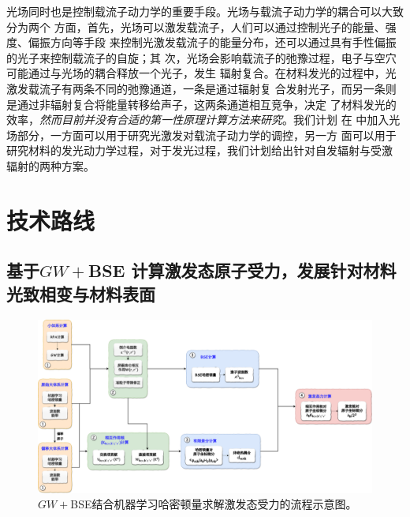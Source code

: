 光场同时也是控制载流子动力学的重要手段。光场与载流子动力学的耦合可以大致分为两个
方面，首先，光场可以激发载流子，人们可以通过控制光子的能量、强度、偏振方向等手段
来控制光激发载流子的能量分布，还可以通过具有手性偏振的光子来控制载流子的自旋；其
次，光场会影响载流子的弛豫过程，电子与空穴可能通过与光场的耦合释放一个光子，发生
辐射复合。在材料发光的过程中，光激发载流子有两条不同的弛豫通道，一条是通过辐射复
合发射光子，而另一条则是通过非辐射复合将能量转移给声子，这两条通道相互竞争，决定
了材料发光的效率，\emph{然而目前并没有合适的第一性原理计算方法来研究}。我们计划
在 \hnamd{} 中加入光场部分，一方面可以用于研究光激发对载流子动力学的调控，另一方
面可以用于研究材料的发光动力学过程，对于发光过程，我们计划给出针对自发辐射与受激
辐射的两种方案。

\section{技术路线}

\subsection{基于$GW+{}$BSE 计算激发态原子受力，发展针对材料光致相变与材料表面}

  \begin{figure}
     \centering
     \captionsetup{width=0.90\textwidth}
     \includegraphics[width=1.0\textwidth]{figs/excited_force_flowchart.pdf}
     \caption{$GW+{}$BSE结合机器学习哈密顿量求解激发态受力的流程示意图。
         \label{fig:excited_force_flowchart}}
  \end{figure}


